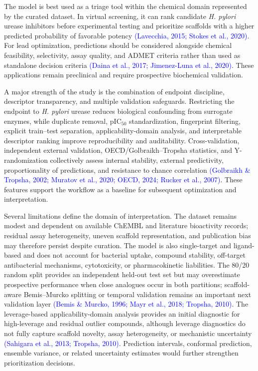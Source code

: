 \documentclass[11pt]{article}
\begin{document}
The model is best used as a triage tool within the chemical domain represented by the curated dataset. In virtual screening, it can rank candidate \textit{H. pylori} urease inhibitors before experimental testing and prioritize scaffolds with a higher predicted probability of favorable potency \textcolor{blue}{(Lavecchia, 2015; Stokes et al., 2020)}. For lead optimization, predictions should be considered alongside chemical feasibility, selectivity, assay quality, and ADMET criteria rather than used as standalone decision criteria \textcolor{blue}{(Daina et al., 2017; Jimenez-Luna et al., 2020)}. These applications remain preclinical and require prospective biochemical validation.

A major strength of the study is the combination of endpoint discipline, descriptor transparency, and multiple validation safeguards. Restricting the endpoint to \textit{H. pylori} urease reduces biological confounding from surrogate enzymes, while duplicate removal, pIC$_{50}$ standardization, fingerprint filtering, explicit train--test separation, applicability-domain analysis, and interpretable descriptor ranking improve reproducibility and auditability. Cross-validation, independent external validation, OECD/Golbraikh--Tropsha statistics, and Y-randomization collectively assess internal stability, external predictivity, proportionality of predictions, and resistance to chance correlation \textcolor{blue}{(Golbraikh \& Tropsha, 2002; Muratov et al., 2020; OECD, 2024; Rucker et al., 2007)}. These features support the workflow as a baseline for subsequent optimization and interpretation.

Several limitations define the domain of interpretation. The dataset remains modest and dependent on available ChEMBL and literature bioactivity records; residual assay heterogeneity, uneven scaffold representation, and publication bias may therefore persist despite curation. The model is also single-target and ligand-based and does not account for bacterial uptake, compound stability, off-target antibacterial mechanisms, cytotoxicity, or pharmacokinetic liabilities. The 80/20 random split provides an independent held-out test set but may overestimate prospective performance when close analogues occur in both partitions; scaffold-aware Bemis--Murcko splitting or temporal validation remains an important next validation layer \textcolor{blue}{(Bemis \& Murcko, 1996; Mayr et al., 2018; Tropsha, 2010)}. The leverage-based applicability-domain analysis provides an initial diagnostic for high-leverage and residual outlier compounds, although leverage diagnostics do not fully capture scaffold novelty, assay heterogeneity, or mechanistic uncertainty \textcolor{blue}{(Sahigara et al., 2013; Tropsha, 2010)}. Prediction intervals, conformal prediction, ensemble variance, or related uncertainty estimates would further strengthen prioritization decisions.
\end{document}
